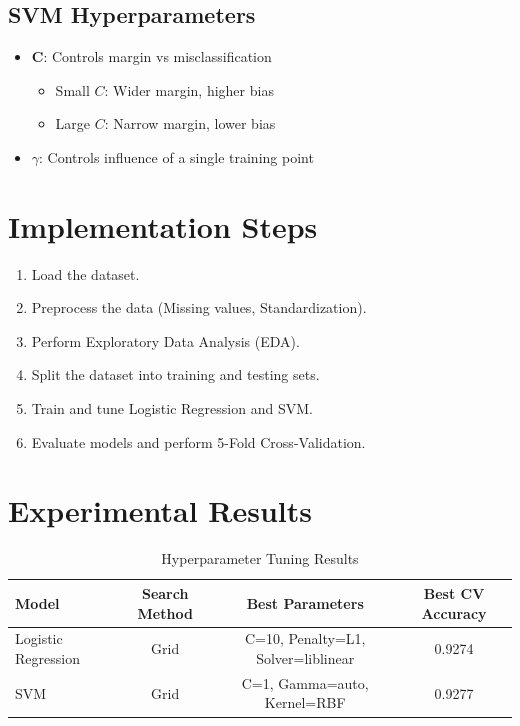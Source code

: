 \documentclass[11pt]{article}
\begin{document}
\subsection*{SVM Hyperparameters}
\begin{itemize}
    \item \textbf{C}: Controls margin vs misclassification
    \begin{itemize}
        \item Small $C$: Wider margin, higher bias
        \item Large $C$: Narrow margin, lower bias
    \end{itemize}
    \item \textbf{$\gamma$}: Controls influence of a single training point
\end{itemize}

\section*{Implementation Steps}
\begin{enumerate}[label=\arabic*.]
    \item Load the dataset.
    \item Preprocess the data (Missing values, Standardization).
    \item Perform Exploratory Data Analysis (EDA).
    \item Split the dataset into training and testing sets.
    \item Train and tune Logistic Regression and SVM.
    \item Evaluate models and perform 5-Fold Cross-Validation.
\end{enumerate}

\section*{Experimental Results}

\begin{table}[H]
\centering
\caption{Hyperparameter Tuning Results}
\renewcommand{\arraystretch}{1.3}
\begin{tabular}{|l|c|c|c|}
\hline
Model & Search Method & Best Parameters & Best CV Accuracy \\ \hline
Logistic Regression & Grid & C=10, Penalty=L1, Solver=liblinear & 0.9274 \\
SVM & Grid & C=1, Gamma=auto, Kernel=RBF & 0.9277 \\ \hline
\end{tabular}
\end{table}
\end{document}
